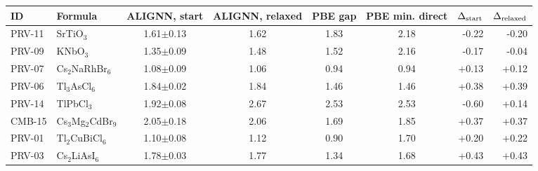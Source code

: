 \begin{tabular}{@{}llccccrr@{}}\toprule
ID & Formula & ALIGNN, start & ALIGNN, relaxed & PBE gap & PBE min. direct & $\Delta_{\rm start}$ & $\Delta_{\rm relaxed}$\\\midrule
PRV-11 & SrTiO$_{3}$ & 1.61$\pm$0.13 & 1.62 & 1.83 & 2.18 & -0.22 & -0.20 \\
PRV-09 & KNbO$_{3}$ & 1.35$\pm$0.09 & 1.48 & 1.52 & 2.16 & -0.17 & -0.04 \\
PRV-07 & Cs$_{2}$NaRhBr$_{6}$ & 1.08$\pm$0.09 & 1.06 & 0.94 & 0.94 & +0.13 & +0.12 \\
PRV-06 & Tl$_{3}$AsCl$_{6}$ & 1.84$\pm$0.02 & 1.84 & 1.46 & 1.46 & +0.38 & +0.39 \\
PRV-14 & TlPbCl$_{3}$ & 1.92$\pm$0.08 & 2.67 & 2.53 & 2.53 & -0.60 & +0.14 \\
CMB-15 & Cs$_{3}$Mg$_{2}$CdBr$_{9}$ & 2.05$\pm$0.18 & 2.06 & 1.69 & 1.85 & +0.37 & +0.37 \\
PRV-01 & Tl$_{2}$CuBiCl$_{6}$ & 1.10$\pm$0.08 & 1.12 & 0.90 & 1.70 & +0.20 & +0.22 \\
PRV-03 & Cs$_{2}$LiAsI$_{6}$ & 1.78$\pm$0.03 & 1.77 & 1.34 & 1.68 & +0.43 & +0.43 \\
\bottomrule\end{tabular}
